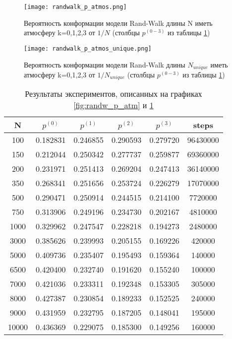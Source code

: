 \begin{figure}[h]
    
\begin{minipage}{0.49\textwidth}
\centering
\texttt{[image: randwalk\_p\_atmos.png]}
\caption{Вероятность конформации модели Rand-Walk длины N иметь атмосферу k=0,1,2,3 от $1/N$  (столбцы $p^{(0-3)}$ из таблицы \ref{tab:randw_p_atm})}
\label{fig:randw_p_atm}
\end{minipage}
\hfill
\begin{minipage}{0.49\textwidth}
\centering
\texttt{[image: randwalk\_p\_atmos\_unique.png]}
\caption{Вероятность конформации модели Rand-Walk длины $N_{unique}$ иметь атмосферу k=0,1,2,3 от $1/N_{unique}$  (столбцы $p^{(0-3)}$ из таблицы \ref{tab:randw_p_atm})}
\label{fig:randw_p_atm_u}
\end{minipage}
\end{figure} 

\begin{table}[h] 
\centering
\begin{tabular}{|c|c|c|c|c|c|}
\hline
N & $p^{(0)}$ & $p^{(1)}$ & $p^{(2)}$ & $p^{(3)}$ & steps \\ \hline
100 & 0.182831 & 0.246855 & 0.290593 & 0.279720 & 96430000 \\ \hline 
150 & 0.212044 & 0.250342 &0.277737 &0.259877 &69360000 \\  \hline
200 & 0.231971 & 0.251413 & 0.269204 & 0.247413 & 36140000 \\ \hline
350 & 0.268341 &0.251656 &0.253724 &0.226279 &17070000 \\ \hline
500 & 0.290471 & 0.250914 & 0.244515 & 0.214100 & 7720000 \\ \hline
750 & 0.313906 &0.249196 &0.234730 &0.202167 &4810000 \\ \hline
1000 & 0.329962& 0.247547 & 0.228218 & 0.194273 & 2480000 \\ \hline
3000 & 0.385626&0.239993&0.205155	&0.169226 &420000 \\ \hline
5000 & 0.409736& 0.235407 & 0.195493 & 0.159364 & 140000 \\ \hline
6500 & 0.420400&0.232740&0.191620	&0.155240 &100000 \\ \hline
7000 & 0.421036&0.233311&0.192348 &0.153305 &	305000 \\ \hline
8000 & 0.427387&0.230854 &0.189233 &0.152525 &	240000 \\ \hline
9000 & 0.431959&0.232795 &0.187205 &0.148041 &195000 \\ \hline
10000&0.436369&0.229075&0.185300&0.149256&160000  \\ \hline
\end{tabular}
\caption{Результаты экспериментов, описанных на графиках \ref{fig:randw_p_atm} и \ref{fig:randw_p_atm_u} }
\label{tab:randw_p_atm}
\end{table}

